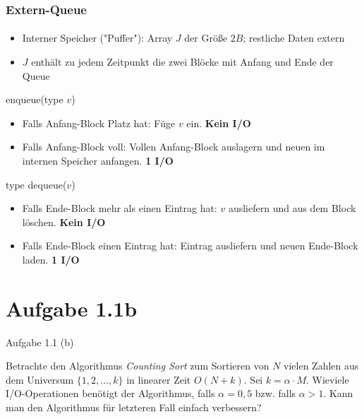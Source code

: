 \documentclass{beamer}
\begin{document}
\begin{frame}
  \frametitle{Extern-Queue}
  \framesubtitle{}
  \begin{itemize}[<+->]
    \item Interner Speicher ("Puffer"): Array $J$ der Größe $2B$; restliche Daten extern
    \item $J$ enthält zu jedem Zeitpunkt die zwei Blöcke mit Anfang und Ende der Queue
  \end{itemize}

  enqueue(type $v$)
  \begin{itemize}[<+->]
    \item Falls Anfang-Block Platz hat: Füge $v$ ein. \bf{Kein I/O}
    \item Falls Anfang-Block voll: Vollen Anfang-Block auslagern und neuen im internen Speicher anfangen. \bf{1 I/O}
  \end{itemize}

  type dequeue($v$)
  \begin{itemize}[<+->]
    \item Falls Ende-Block mehr als einen Eintrag hat: $v$ ausliefern und aus dem Block löschen. \bf{Kein I/O}
    \item Falls Ende-Block einen Eintrag hat: Eintrag ausliefern und neuen Ende-Block laden. \bf{1 I/O}
  \end{itemize}
\end{frame}


\section{Aufgabe 1.1b}
\begin{frame}{Aufgabe 1.1 (b)}

  Betrachte den Algorithmus \emph{Counting Sort} zum Sortieren von $N$ vielen Zahlen aus dem Universum $\{1,2,\dots{},k\}$ in linearer Zeit $O(N+k)$. 
  Sei $k = \alpha \cdot M$.
  Wieviele I/O-Operationen benötigt der Algorithmus, falls $\alpha = 0,5$ bzw. falls $\alpha > 1$.
  Kann man den Algorithmus für letzteren Fall einfach verbessern?
\end{frame}
\end{document}
